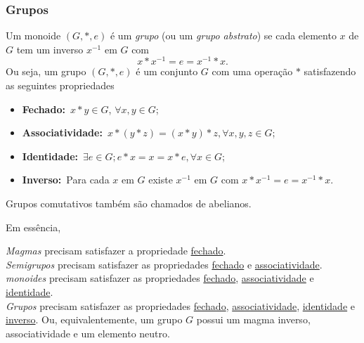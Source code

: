       \subsubsection{Grupos}
         \begin{definition}
            Um monoide $(G, * , e)$ é um \emph{grupo} (ou um \emph{grupo abstrato}) se cada elemento $x$ de $G$ tem um inverso $x^{-1}$ em $G$ com $$x * x^{-1} = e = x^{-1} * x.$$
            Ou seja, um grupo $(G,* , e)$ é um conjunto $G$ com uma operação $*$ satisfazendo as seguintes propriedades
            \begin{itemize}
               \item \textbf{Fechado:}\ $x* y \in G$, $\forall x,y \in G$;
               \item \textbf{Associatividade:}\ $x * (y* z) = (x* y) * z, \forall x,y,z \in G$;
               \item \textbf{Identidade:}\ $\exists e \in G; e* x = x = x* e, \forall x \in G$;
               \item \textbf{Inverso:}\ Para cada $x$ em $G$ existe $x^{-1}$ em $G$ com $x* x^{-1} = e = x^{-1} * x$.
            \end{itemize}
            Grupos comutativos também são chamados de abelianos.
         \end{definition}
         Em essência, 

         \emph{Magmas} precisam satisfazer a propriedade \underline{fechado}.\\
         \emph{Semigrupos} precisam satisfazer as propriedades \underline{fechado} e \underline{associatividade}.\\
         \emph{monoides} precisam satisfazer as propriedades \underline{fechado}, \underline{associatividade} e \underline{identidade}.\\
         \emph{Grupos} precisam satisfazer as propriedades \underline{fechado}, \underline{associatividade}, \underline{identidade} e \underline{inverso}. Ou, equivalentemente, um grupo $G$ possui um magma inverso, associatividade e um elemento neutro.

